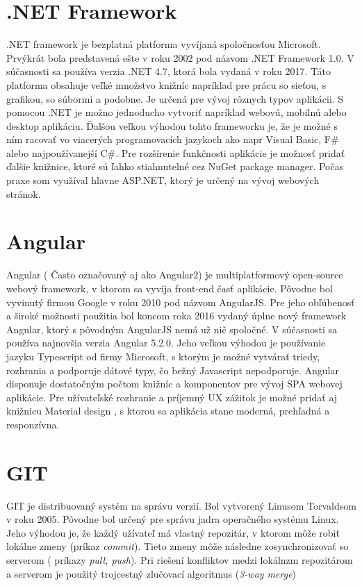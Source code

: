 \documentclass[11pt, oneside]{report}
\begin{document}
\section{.NET Framework}

.NET framework \cite{net} je bezplatná platforma vyvíjaná spoločnosťou Microsoft. Prvýkrát bola predstavená ešte v roku 2002 pod názvom .NET Framework 1.0. V súčasnosti sa používa verzia .NET 4.7, ktorá bola vydaná v roku 2017. Táto platforma obsahuje veľké množstvo knižníc napríklad pre prácu   so sieťou, s grafikou,  so súbormi a podobne. Je určená pre vývoj rôznych typov aplikácii. S pomocou .NET  je možno jednoducho vytvoriť napríklad webovú, mobilnú alebo desktop aplikáciu. Ďalšou veľkou výhodou tohto frameworku je, že je možné  s ním racovať vo viacerých programovacích jazykoch ako napr Visual Basic, F\# alebo najpoužívanejší C\#. Pre rozšírenie funkčnosti aplikácie je možnosť pridať ďalšie knižnice, ktoré sú ľahko stiahnutelné cez NuGet package manager. Počas praxe som využíval hlavne ASP.NET, ktorý je určený na vývoj webových stránok.

\section{Angular}
Angular\cite{angular} ( Často označovaný aj ako Angular2) je multiplatformový  open-source webový framework, v ktorom sa vyvíja front-end časť aplikácie. Pôvodne bol vyvinutý firmou Google v roku 2010 pod názvom AngularJS. Pre jeho obľúbenosť a široké  možnosti použitia bol koncom roka 2016 vydaný úplne nový framework Angular, ktorý s pôvodným AngularJS nemá už nič spoločné. V súčasnosti sa používa najnovšia verzia Angular 5.2.0.
Jeho veľkou výhodou je používanie jazyku Typescript od firmy Microsoft,  s ktorým je možné vytvárať triedy, rozhrania a podporuje dátové typy, čo bežný Javascript nepodporuje. Angular disponuje dostatočným počtom knižníc a komponentov pre vývoj  SPA webovej aplikácie. Pre užívateľské rozhranie a príjemný UX zážitok je možné pridať aj knižnicu Material design \cite{material}, s ktorou  sa aplikácia stane moderná, prehľadná a responzívna.

\section{GIT}
GIT\cite{git} je distribuovaný systém na správu verzií. Bol vytvorený Linusom Torvaldsom v roku 2005. Pôvodne bol určený pre správu jadra operačného systému Linux. Jeho výhodou je, že každý užívateľ má vlastný repozitár, v ktorom môže robiť lokálne zmeny (príkaz \textit{commit}). Tieto zmeny môže následne zosynchronizovať  so serverom ( príkazy \textit{ pull, push}). Pri riešení konfliktov medzi lokálnzm repozitárom a serverom je použitý trojcestný zlučovací algoritmus (\textit{3-way merge}) 
\end{document}
